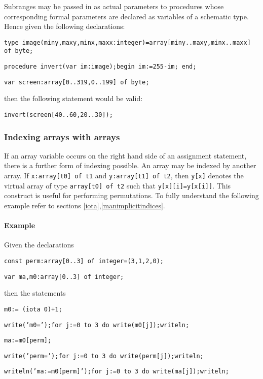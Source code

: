 {Subranges may be passed in as actual parameters to procedures
whose corresponding formal parameters are declared as variables
of a schematic type. Hence given the following declarations:

\texttt{type image(miny,maxy,minx,maxx:integer)=array{[}miny..maxy,minx..maxx{]}
of byte;}

\texttt{procedure invert(var im:image);begin im:=255-im; end;}

\texttt{var screen:array{[}0..319,0..199{]} of byte;}

then the following statement would be valid:

\texttt{invert(screen{[}40..60,20..30{]});}


\subsubsection{Indexing arrays with arrays}

If an array variable occurs on the right hand side of an assignment
statement, there is a further form of indexing possible. An array may be indexed
by another array. If \texttt{x:array{[}t0{]} of t1} and \texttt{y:array{[}t1{]}
of t2}, then \texttt{y{[}x{]}} denotes the virtual array of type \texttt{array{[}t0{]}
of t2} such that \texttt{y{[}x{]}{[}i{]}=y{[}x{[}i{]}{]}}. This construct is
useful for performing permutations. To fully understand the following example
refer to sections \ref{iota},\ref{manimplicitindices}.


\paragraph{Example}

Given the declarations

\texttt{const perm:array{[}0..3{]} of integer=(3,1,2,0);}

\texttt{var ma,m0:array{[}0..3{]} of integer; }

then the statements

\texttt{m0:= (iota 0)+1;}

\texttt{write('m0=');for j:=0 to 3 do write(m0{[}j{]});writeln;}

\texttt{ma:=m0{[}perm{]}; }

\texttt{write('perm=');for j:=0 to 3 do write(perm{[}j{]});writeln; }

\texttt{writeln('ma:=m0{[}perm{]}');for j:=0 to 3 do write(ma{[}j{]});writeln;}

}
